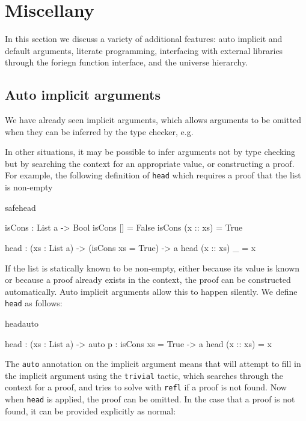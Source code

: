 \section{Miscellany}

In this section we discuss a variety of additional features:
auto implicit and default 
arguments, literate programming, interfacing with external libraries through the
foriegn function interface, and the universe hierarchy.

\subsection{Auto implicit arguments}

We have already seen implicit arguments, which allows arguments to be omitted when
they can be inferred by the type checker, e.g.


\noindent
In other situations, it may be possible to infer arguments not by type checking but
by searching the context for an appropriate value, or constructing a proof. For example,
the following definition of \texttt{head} which requires a proof that the list is
non-empty

\begin{SaveVerbatim}{safehead}

isCons : List a -> Bool
isCons [] = False
isCons (x :: xs) = True

head : (xs : List a) -> (isCons xs = True) -> a
head (x :: xs) _ = x

\end{SaveVerbatim}

\noindent
If the list is statically known to be non-empty, either because its value is known or
because a proof already exists in the context, the proof can be constructed
automatically. Auto implicit arguments allow this to happen silently. We define
\texttt{head} as follows:

\begin{SaveVerbatim}{headauto}

head : (xs : List a) -> {auto p : isCons xs = True} -> a
head (x :: xs) = x

\end{SaveVerbatim}

\noindent
The \texttt{auto} annotation on the implicit argument means that \Idris{} will
attempt to fill in the implicit argument using the \texttt{trivial} tactic, which
searches through the context for a proof, and tries to solve with \texttt{refl}
if a proof is not found.
Now when \texttt{head} is applied, the proof can be omitted. In the case that a proof
is not found, it can be provided explicitly as normal:


